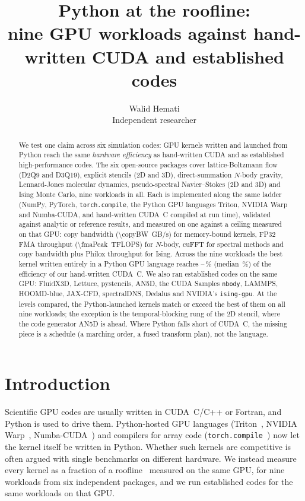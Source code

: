 \documentclass[11pt]{article}
\title{Python at the roofline:\\
nine GPU workloads against hand-written CUDA and established codes}
\author{Walid Hemati\\Independent researcher}
\date{}
\begin{document}
\maketitle

\begin{abstract}
We test one claim across six simulation codes: GPU kernels written and launched from Python reach
the same \emph{hardware efficiency} as hand-written CUDA and as established high-performance
codes. The six open-source packages cover lattice-Boltzmann flow (D2Q9 and D3Q19), explicit
stencils (2D and 3D), direct-summation $N$-body gravity, Lennard-Jones molecular dynamics,
pseudo-spectral Navier--Stokes (2D and 3D) and Ising Monte Carlo, nine workloads in all. Each is
implemented along the same ladder (NumPy, PyTorch, \texttt{torch.compile}, the Python GPU
languages Triton, NVIDIA Warp and Numba-CUDA, and hand-written CUDA~C compiled at run time), validated
against analytic or reference results, and measured on one \gpuName{} against a ceiling measured
on that GPU: copy bandwidth (\SI{\copyBW}{GB/s}) for memory-bound kernels, FP32 FMA throughput
(\SI{\fmaPeak}{TFLOPS}) for $N$-body, cuFFT for spectral methods and copy bandwidth plus Philox
throughput for Ising. Across the nine workloads the best kernel written entirely in a Python GPU
language reaches \dslOverCudaMin--\dslOverCudaMax\,\% (median \dslOverCudaMedian\,\%) of the
efficiency of our hand-written CUDA~C. We also ran established codes on the same GPU: FluidX3D,
Lettuce, pystencils, AN5D, the CUDA Samples \texttt{nbody}, LAMMPS, HOOMD-blue, JAX-CFD,
spectralDNS, Dedalus and NVIDIA's \texttt{ising-gpu}. At the levels compared, the Python-launched kernels match or exceed the best of them on all
nine workloads; the exception is the temporal-blocking rung of the 2D stencil, where the code
generator AN5D is ahead. Where Python falls short of CUDA~C, the
missing piece is a schedule (a marching order, a fused transform plan), not the language.
\end{abstract}

\section{Introduction}

Scientific GPU codes are usually written in CUDA~C/C++ or Fortran, and Python is used to drive
them. Python-hosted GPU languages (Triton~\citep{tillet2019triton}, NVIDIA
Warp~\citep{macklin2022warp}, Numba-CUDA~\citep{lam2015numba}) and compilers for array code
(\texttt{torch.compile}~\citep{ansel2024pytorch2}) now let the kernel itself be written in Python.
Whether such kernels are competitive is often argued with single benchmarks on different
hardware. We instead measure every kernel as a fraction of a roofline~\citep{williams2009roofline}
measured on the same GPU, for nine workloads from six independent packages, and we run
established codes for the same workloads on that GPU.
\end{document}
